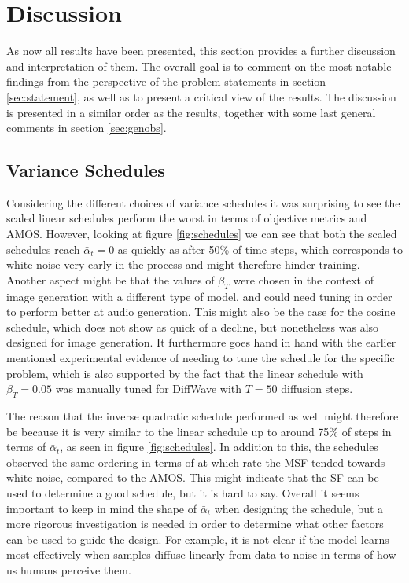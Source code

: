 \documentclass{report}
\begin{document}
\newpage
\chapter{Discussion}

As now all results have been presented, this section provides a further discussion and interpretation of them. The overall goal is to comment on the most notable findings from the perspective of the problem statements in section \ref{sec:statement}, as well as to present a critical view of the results. The discussion is presented in a similar order as the results, together with some last general comments in section \ref{sec:genobs}.

\section{Variance Schedules}

Considering the different choices of variance schedules it was surprising to see the scaled linear schedules perform the worst in terms of objective metrics and AMOS. However, looking at figure \ref{fig:schedules} we can see that both the scaled schedules reach $\bar{\alpha}_t = 0$ as quickly as after 50\% of time steps, which corresponds to white noise very early in the process and might therefore hinder training. Another aspect might be that the values of $\beta_T$ were chosen in the context of image generation with a different type of model, and could need tuning in order to perform better at audio generation. This might also be the case for the cosine schedule, which does not show as quick of a decline, but nonetheless was also designed for image generation. It furthermore goes hand in hand with the earlier mentioned experimental evidence of needing to tune the schedule for the specific problem, which is also supported by the fact that the linear schedule with $\beta_T=0.05$ was manually tuned for DiffWave with $T=50$ diffusion steps.

The reason that the inverse quadratic schedule performed as well might therefore be because it is very similar to the linear schedule up to around 75\% of steps in terms of  $\bar{\alpha}_t$, as seen in figure \ref{fig:schedules}. In addition to this, the schedules observed the same ordering in terms of at which rate the MSF tended towards white noise, compared to the AMOS. This might indicate that the SF can be used to determine a good schedule, but it is hard to say. Overall it seems important to keep in mind the shape of $\bar{\alpha}_t$ when designing the schedule, but a more rigorous investigation is needed in order to determine what other factors can be used to guide the design. For example, it is not clear if the model learns most effectively when samples diffuse linearly from data to noise in terms of how us humans perceive them.
\end{document}
